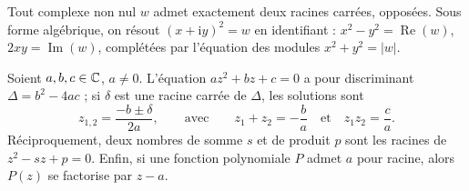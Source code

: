 
\begin{propriete}
Tout complexe non nul $w$ admet exactement deux racines carrées, opposées.
Sous forme algébrique, on résout $(x+\mathrm{i}y)^{2}=w$ en identifiant :
$x^{2}-y^{2}=\operatorname{Re}(w)$, $2xy=\operatorname{Im}(w)$, complétées
par l'équation des modules $x^{2}+y^{2}=|w|$.
\end{propriete}

\begin{theoreme}
Soient $a,b,c\in\mathbb{C}$, $a\neq0$. L'équation $az^{2}+bz+c=0$ a pour
discriminant $\Delta=b^{2}-4ac$ ; si $\delta$ est une racine carrée de
$\Delta$, les solutions sont
\[
  z_{1,2}=\frac{-b\pm\delta}{2a},
  \qquad\text{avec}\qquad
  z_1+z_2=-\frac{b}{a}\quad\text{et}\quad z_1z_2=\frac{c}{a}.
\]
Réciproquement, deux nombres de somme $s$ et de produit $p$ sont les racines
de $z^{2}-sz+p=0$. Enfin, si une fonction polynomiale $P$ admet $a$ pour
racine, alors $P(z)$ se factorise par $z-a$.
\end{theoreme}


